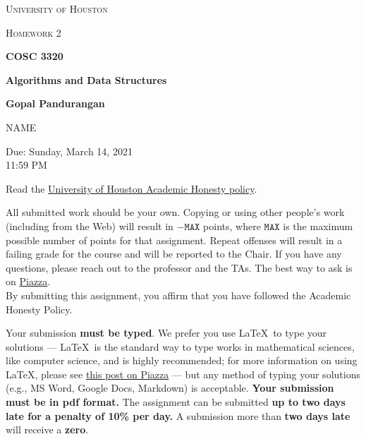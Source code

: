 \documentclass[final]{article}
\begin{document}
\begin{titlepage}
    \begin{center}
        {\scshape\LARGE University of Houston\par}
        \vspace{1cm}
        {\scshape\Large Homework 2 \par}
        \vspace{1.5cm}
        {\huge\bfseries COSC 3320 \par}
        {\huge\bfseries Algorithms and Data Structures \par}
        \vspace{0.5cm}
        {\large\bfseries Gopal Pandurangan\par}
        \vspace{2cm}
        {\Large NAME\par}
        \vspace{0.5cm}
        {\large \par} Due: Sunday, March 14, 2021\\11:59 PM
    \end{center}


    Read the \href{https://www.uh.edu/provost/policies-resources/honesty/_documents-honesty/academic-honesty-policy.pdf}{University of Houston Academic Honesty policy}.

    \begin{tcolorbox}[title=Academic Honesty Policy,colback=red!15,colframe=red!65!black,fonttitle=\bfseries]All submitted work should be your own. Copying or using other people's work (including from the Web) will result in \(-\texttt{MAX}\) points, where \(\texttt{MAX}\) is the maximum possible number of points for that assignment. Repeat offenses will result in a failing grade for the course and will be reported to the Chair. If you have any questions, please reach out to the professor and the TAs. The best way to ask is on \href{https://piazza.com/uh/spring2021/cosc3320/home}{Piazza}.\\

        By submitting this assignment, you affirm that you have followed the Academic Honesty Policy.
    \end{tcolorbox}

    Your submission \textbf{must be typed}. We prefer you use \LaTeX~to type your solutions --- \LaTeX~is the standard way to type works in mathematical sciences, like computer science, and is highly recommended; for more information on using \LaTeX, please see \href{https://piazza.com/class/kjxhee6ctqe6cj?cid=8}{this post on Piazza} --- but any method of typing your solutions (e.g., MS Word, Google Docs, Markdown) is acceptable. \textbf{Your submission must be in pdf format.} The assignment can be submitted \textbf{up to two days late for a penalty of 10\% per day.} A submission more than \textbf{two days late} will receive a \textbf{zero}.


\end{titlepage}
\end{document}

